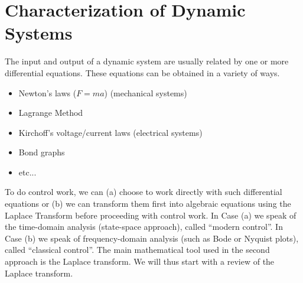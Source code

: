 \documentclass{book}
\begin{document}
\section*{Characterization of Dynamic Systems}
The input and output of a dynamic system are usually related by one or more differential equations. These equations can be obtained in a variety of ways.
\begin{itemize}
	\item Newton's laws ($ F=ma $) (mechanical systems)
	\item Lagrange Method
	\item Kirchoff's voltage/current laws (electrical systems)
	\item Bond graphs
	\item etc...
\end{itemize}
To do control work, we can (a) choose to work directly with such differential equations or (b) we can transform them first into algebraic equations using the Laplace Transform before proceeding with control work. In Case (a) we speak of the time-domain analysis (state-space approach), called ``modern control''. In Case (b) we speak of frequency-domain analysis (such as Bode or Nyquist plots), called ``classical control''. The main mathematical tool used in the second approach is the Laplace transform. We will thus start with a review of the Laplace transform.
\end{document}
